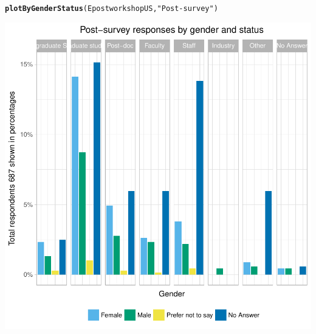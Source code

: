 \documentclass{article}\usepackage[]{graphicx}\usepackage[]{color}
\makeatletter
\newcommand{\hlstr}[1]{\textcolor[rgb]{0.192,0.494,0.8}{#1}}%
\newcommand{\hlstd}[1]{\textcolor[rgb]{0.345,0.345,0.345}{#1}}%
\newcommand{\hlkwd}[1]{\textcolor[rgb]{0.737,0.353,0.396}{\textbf{#1}}}%
\newenvironment{kframe}{%
 \def\at@end@of@kframe{}%
 \ifinner\ifhmode%
  \def\at@end@of@kframe{\end{minipage}}%
  \begin{minipage}{\columnwidth}%
 \fi\fi%
 \def\FrameCommand##1{\hskip\@totalleftmargin \hskip-\fboxsep
 \colorbox{shadecolor}{##1}\hskip-\fboxsep
     \hskip-\linewidth \hskip-\@totalleftmargin \hskip\columnwidth}%
 \MakeFramed {\advance\hsize-\width
   \@totalleftmargin\z@ \linewidth\hsize
   \@setminipage}}%
 {\par\unskip\endMakeFramed%
 \at@end@of@kframe}
\newenvironment{knitrout}{}{} %
\makeatother
\begin{document}
\begin{knitrout}
{}


\begin{kframe}\begin{alltt}
\hlkwd{plotByGenderStatus}\hlstd{(EpostworkshopUS,} \hlstr{"Post-survey"}\hlstd{)}
\end{alltt}
\end{kframe}

{\centering \includegraphics[width=.6\linewidth]{figure/calls-Rnwplotting-pre-postsurvey-dataUS-3} 

}



\end{knitrout}
\end{document}
